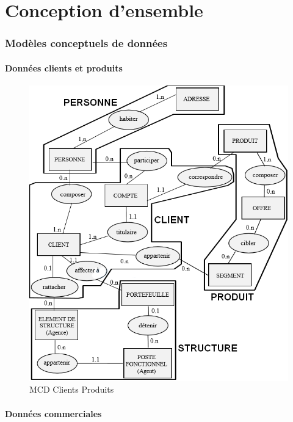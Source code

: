 \part{Conception d'ensemble}
\setcounter{section}{0}

\section{Modèles conceptuels de données} 

\subsection{Données clients et produits} 

\begin{figure}[H]
\centering
\includegraphics[width=\textwidth]{figures/mcd/MCD_Clients_Produits}
\caption{MCD Clients Produits}
\end{figure}


\subsection{Données commerciales}


